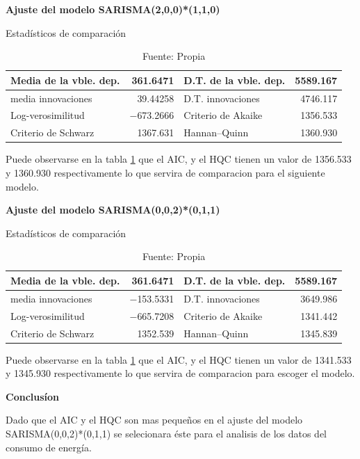 \documentclass[12pt,letterpaper]{report}
\begin{document}
\textbf{Ajuste del modelo SARISMA(2,0,0)*(1,1,0)}

\begin{center}
\begin{table}[htb]
\caption{Estadísticos de comparación}
\begin{tabular}{lrlr}
 \hline
Media de la vble. dep. &  361.6471 & D.T. de la vble. dep. &  5589.167 \\
 \hline
media innovaciones &  39.44258 & D.T. innovaciones &  4746.117 \\
 \hline
Log-verosimilitud & $-$673.2666 & Criterio de Akaike &  1356.533 \\
 \hline
Criterio de Schwarz &  1367.631 & Hannan--Quinn &  1360.930 \\
 \hline
\end{tabular}
\caption*{Fuente: Propia} \label{xDD}
\end{table}
\end{center}

Puede observarse en la tabla \ref{xDD} que el AIC, y el HQC tienen un valor de 1356.533 y 1360.930
respectivamente lo que servira de comparacion para el siguiente modelo.


\textbf{Ajuste del modelo SARISMA(0,0,2)*(0,1,1)}

\begin{center}

\begin{table}[htb]
\caption{Estadísticos de comparación}
\begin{tabular}{lrlr}
 \hline
Media de la vble. dep. &  361.6471 & D.T. de la vble. dep. &  5589.167 \\
 \hline
media innovaciones & $-$153.5331 & D.T. innovaciones &  3649.986 \\
 \hline
Log-verosimilitud & $-$665.7208 & Criterio de Akaike &  1341.442 \\
 \hline
Criterio de Schwarz &  1352.539 & Hannan--Quinn &  1345.839 \\
 \hline
\end{tabular}
\caption*{Fuente: Propia} \label{xDD2}
\end{table}

\end{center}

Puede observarse en la tabla \ref{xDD} que el AIC, y el HQC tienen un valor de 1341.533 y 1345.930
respectivamente lo que servira de comparacion para escoger el modelo.

\textbf{Conclusíon}

Dado que el AIC y el HQC son mas pequeños en el ajuste del modelo SARISMA(0,0,2)*(0,1,1) se selecionara éste para el analisis de los datos del consumo de energía.
\end{document}
